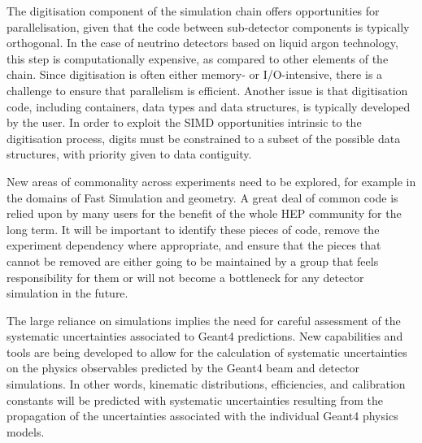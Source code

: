 \documentclass[12pt,a4paper]{article}
\begin{document}
The digitisation component of the simulation chain offers opportunities
for parallelisation, given that the code between sub-detector components
is typically orthogonal. In the case of neutrino detectors based on
liquid argon technology, this step is computationally expensive, as
compared to other elements of the chain. Since digitisation is often
either memory- or I/O-intensive, there is a challenge to ensure that
parallelism is efficient. Another issue is that digitisation code,
including containers, data types and data structures, is typically
developed by the user. In order to exploit the SIMD opportunities
intrinsic to the digitisation process, digits must be constrained to a
subset of the possible data structures, with priority given to data
contiguity.

New areas of commonality across experiments need to be explored, for
example in the domains of Fast Simulation and geometry. A great deal of
common code is relied upon by many users for the benefit of the whole
HEP community for the long term. It will be important to identify these
pieces of code, remove the experiment dependency where appropriate, and
ensure that the pieces that cannot be removed are either going to be
maintained by a group that feels responsibility for them or will not
become a bottleneck for any detector simulation in the future.

The large reliance on simulations implies the need for careful
assessment of the systematic uncertainties associated to Geant4
predictions. New capabilities and tools are being developed to allow for
the calculation of systematic uncertainties on the physics observables
predicted by the Geant4 beam and detector simulations. In other words,
kinematic distributions, efficiencies, and calibration constants will be
predicted with systematic uncertainties resulting from the propagation
of the uncertainties associated with the individual Geant4 physics
models.
\end{document}
